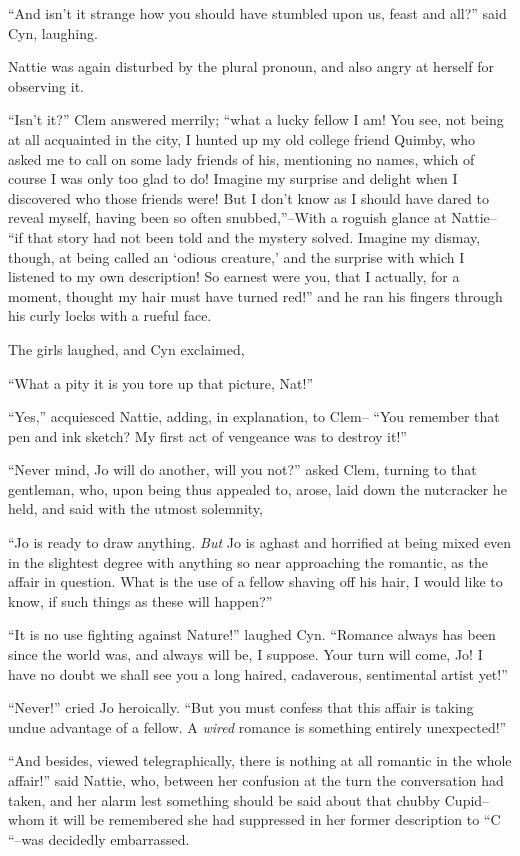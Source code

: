 ``And isn't it strange how you should have stumbled upon us, feast and
all?'' said Cyn, laughing.

Nattie was again disturbed by the plural pronoun, and also angry at
herself for observing it.

``Isn't it?'' Clem answered merrily; ``what a lucky fellow I am! You see,
not being at all acquainted in the city, I hunted up my old college
friend Quimby, who asked me to call on some lady friends of his,
mentioning no names, which of course I was only too glad to do! Imagine
my surprise and delight when I discovered who those friends were! But I
don't know as I should have dared to reveal myself, having been so often
snubbed,''--With a roguish glance at Nattie-- ``if that story had not been
told and the mystery solved. Imagine my dismay, though, at being called
an `odious creature,' and the surprise with which I listened to my own
description! So earnest were you, that I actually, for a moment, thought
my hair must have turned red!'' and he ran his fingers through his curly
locks with a rueful face.

The girls laughed, and Cyn exclaimed,

``What a pity it is you tore up that picture, Nat!''

``Yes,'' acquiesced Nattie, adding, in explanation, to Clem-- ``You
remember that pen and ink sketch? My first act of vengeance was to
destroy it!''

``Never mind, Jo will do another, will you not?'' asked Clem, turning to
that gentleman, who, upon being thus appealed to, arose, laid down the
nutcracker he held, and said with the utmost solemnity,

``Jo is ready to draw anything. \emph{But} Jo is aghast and horrified at being
mixed even in the slightest degree with anything so near approaching the
romantic, as the affair in question. What is the use of a fellow shaving
off his hair, I would like to know, if such things as these will
happen?''

``It is no use fighting against Nature!'' laughed Cyn. ``Romance always has
been since the world was, and always will be, I suppose. Your turn will
come, Jo! I have no doubt we shall see you a long haired, cadaverous,
sentimental artist yet!''

``Never!'' cried Jo heroically. ``But you must confess that this affair is
taking undue advantage of a fellow. A \emph{wired} romance is something
entirely unexpected!''

``And besides, viewed telegraphically, there is nothing at all romantic
in the whole affair!'' said Nattie, who, between her confusion at the
turn the conversation had taken, and her alarm lest something should be
said about that chubby Cupid--whom it will be remembered she had
suppressed in her former description to ``C ``--was decidedly embarrassed.

